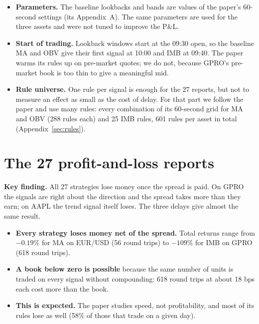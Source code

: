 \documentclass[11pt]{article}
\newcommand{\keyfinding}[1]{%
  \begingroup\setlength{\fboxsep}{9pt}%
  \noindent\colorbox{boxbg}{\parbox{\dimexpr\linewidth-2\fboxsep\relax}{\textbf{\color{accent}Key finding.} #1}}%
  \endgroup\par\vspace{0.5em}}
\begin{document}
\begin{itemize}
  \item \textbf{Parameters.} The baseline lookbacks and bands are values of the
        paper's 60-second settings (its Appendix~A). The same parameters are used
        for the three assets and were not tuned to improve the P\&L.
  \item \textbf{Start of trading.} Lookback windows start at the 09:30 open, so
        the baseline MA and OBV give their first signal at 10:00 and IMB at 09:40.
        The paper warms its rules up on pre-market quotes; we do not, because
        GPRO's pre-market book is too thin to give a meaningful mid.
  \item \textbf{Rule universe.} One rule per signal is enough for the 27 reports,
        but not to measure an effect as small as the cost of delay. For that part
        we follow the paper and use many rules: every combination of its
        60-second grid for MA and OBV (288 rules each) and 25 IMB rules, 601 rules
        per asset in total (Appendix~\ref{sec:rules}).
\end{itemize}

\section{The 27 profit-and-loss reports}
\label{sec:pnl}

\keyfinding{All 27 strategies lose money once the spread is paid. On GPRO the
signals are right about the direction and the spread takes more than they earn;
on AAPL the trend signal itself loses. The three delays give almost the same
result.}

\begin{table}[H]
  \centering
  \small
  \setlength{\tabcolsep}{4.5pt}
  \caption{The 27 profit-and-loss reports. Total return is the sum of the simple
  round-trip returns; P\&L is in dollars for the fixed number of units.}
  \label{tab:pnl}
  
\end{table}

\begin{itemize}
  \item \textbf{Every strategy loses money net of the spread.} Total returns range
        from $-0.19\%$ for MA on EUR/USD (56 round trips) to $-109\%$ for IMB on
        GPRO (618 round trips).
  \item \textbf{A book below zero is possible} because the same number of units is
        traded on every signal without compounding: 618 round trips at about
        18 bps each cost more than the book.
  \item \textbf{This is expected.} The paper studies speed, not profitability, and
        most of its rules lose as well (58\% of those that trade on a given day).
\end{itemize}
\end{document}
